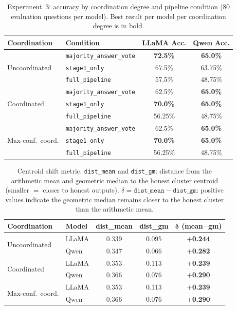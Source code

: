\documentclass[11pt]{article}
\begin{document}
\begin{table}[t]
\centering
\caption{Experiment~3: accuracy by coordination degree and pipeline condition
  (80 evaluation questions per model). Best result per model per coordination
  degree is in bold.}
\label{tab:exp3-accuracy}
\small
\begin{tabular}{llcc}
\toprule
\textbf{Coordination} & \textbf{Condition}
  & \textbf{LLaMA Acc.} & \textbf{Qwen Acc.} \\
\midrule
\multirow{3}{*}{Uncoordinated}
  & \texttt{majority\_answer\_vote} & \textbf{72.5\%} & \textbf{65.0\%} \\
  & \texttt{stage1\_only}           & 67.5\%          & 63.75\%         \\
  & \texttt{full\_pipeline}         & 57.5\%          & 48.75\%         \\
\midrule
\multirow{3}{*}{Coordinated}
  & \texttt{majority\_answer\_vote} & 62.5\%          & \textbf{65.0\%} \\
  & \texttt{stage1\_only}           & \textbf{70.0\%} & \textbf{65.0\%} \\
  & \texttt{full\_pipeline}         & 56.25\%         & 48.75\%         \\
\midrule
\multirow{3}{*}{Max-conf.\ coord.}
  & \texttt{majority\_answer\_vote} & 62.5\%          & \textbf{65.0\%} \\
  & \texttt{stage1\_only}           & \textbf{70.0\%} & \textbf{65.0\%} \\
  & \texttt{full\_pipeline}         & 56.25\%         & 48.75\%         \\
\bottomrule
\end{tabular}
\end{table}

\begin{table}[t]
\centering
\caption{Centroid shift metric. \texttt{dist\_mean} and \texttt{dist\_gm}: distance
  from the arithmetic mean and geometric median to the honest cluster centroid
  (smaller $=$ closer to honest outputs). $\delta = \texttt{dist\_mean} - \texttt{dist\_gm}$:
  positive values indicate the geometric median remains closer to the honest
  cluster than the arithmetic mean.}
\label{tab:centroid-shift}
\small
\begin{tabular}{llccc}
\toprule
\textbf{Coordination} & \textbf{Model}
  & \textbf{dist\_mean} & \textbf{dist\_gm}
  & $\bm{\delta}$ (mean$-$gm) \\
\midrule
\multirow{2}{*}{Uncoordinated}
  & LLaMA & 0.339 & 0.095 & \textbf{$+$0.244} \\
  & Qwen  & 0.347 & 0.066 & \textbf{$+$0.282} \\
\midrule
\multirow{2}{*}{Coordinated}
  & LLaMA & 0.353 & 0.113 & \textbf{$+$0.239} \\
  & Qwen  & 0.366 & 0.076 & \textbf{$+$0.290} \\
\midrule
\multirow{2}{*}{Max-conf.\ coord.}
  & LLaMA & 0.353 & 0.113 & \textbf{$+$0.239} \\
  & Qwen  & 0.366 & 0.076 & \textbf{$+$0.290} \\
\bottomrule
\end{tabular}
\end{table}
\end{document}
